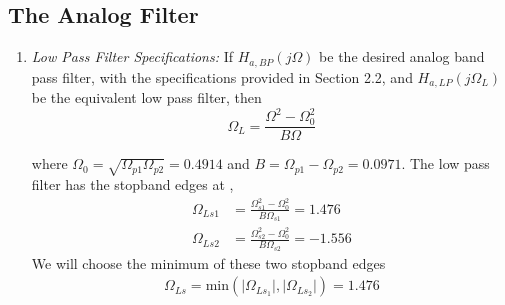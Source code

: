 \documentclass{article}
\begin{document}
\subsection{The Analog Filter}
\begin{enumerate}

\item {\em Low Pass Filter Specifications:}  If $H_{a, BP}(j\Omega)$ be the desired analog band
pass filter,  with the specifications provided in Section 2.2, and $H_{a,LP}(j\Omega_L)$ 
be the equivalent low pass filter, then
\begin{equation}
\label{transition}
\Omega_L = \frac{\Omega^2 - \Omega_0^2}{B\Omega}
\end{equation}

where $\Omega_0 = \sqrt{\Omega_{p1}\Omega_{p2}} = 0.4914$ and $B = \Omega_{p1} - \Omega_{p2} = 0.0971$.  The low pass filter has
the stopband edges at ,
\begin{align}
    \Omega_{Ls1} &= \frac{\Omega_{s1}^2 - \Omega_0^2}{B\Omega_{s1}} = 1.476\\
    \Omega_{Ls2} &= \frac{\Omega_{s2}^2 - \Omega_0^2}{B\Omega_{s2}} = -1.556
\end{align}
We will choose the minimum of these two stopband edges
\begin{align}
    \Omega_{Ls} = \mbox{min}(\vert \Omega_{Ls_1}\vert,\vert \Omega_{Ls_2}\vert) = 1.476
\end{align}


\end{enumerate}
\end{document}
